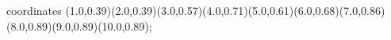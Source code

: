 					coordinates { (1.0,0.39)(2.0,0.39)(3.0,0.57)(4.0,0.71)(5.0,0.61)(6.0,0.68)(7.0,0.86)(8.0,0.89)(9.0,0.89)(10.0,0.89)};